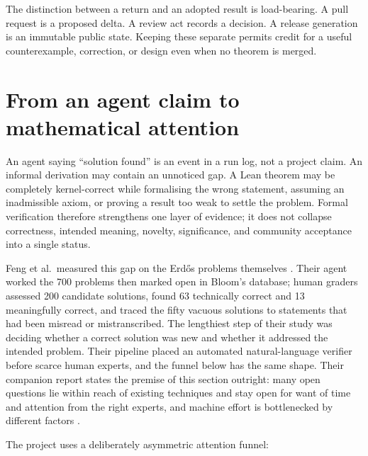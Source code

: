 \documentclass[10pt]{article}
\begin{document}
The distinction between a return and an adopted result is load-bearing.  A
pull request is a proposed delta.  A review act records a decision.  A release
generation is an immutable public state.  Keeping these separate permits
credit for a useful counterexample, correction, or design even when no theorem
is merged.

\section{From an agent claim to mathematical attention}\label{sec:attention}

An agent saying ``solution found'' is an event in a run log, not a project
claim.  An informal derivation may contain an unnoticed gap.  A Lean theorem
may be completely kernel-correct while formalising the wrong statement,
assuming an inadmissible axiom, or proving a result too weak to settle the
problem.  Formal verification therefore strengthens one layer of evidence;
it does not collapse correctness, intended meaning, novelty, significance,
and community acceptance into a single status.

Feng et al.\ measured this gap on the Erd\H{o}s problems themselves
\cite{aletheia}.  Their agent worked the 700 problems then marked open in
Bloom's database; human graders assessed 200 candidate solutions, found 63
technically correct and 13 meaningfully correct, and traced the fifty vacuous
solutions to statements that had been misread or mistranscribed.  The
lengthiest step of their study was deciding whether a correct solution was
new and whether it addressed the intended problem.  Their pipeline placed an
automated natural-language verifier before scarce human experts, and the
funnel below has the same shape.  Their companion report states the premise
of this section outright: many open questions lie within reach of existing
techniques and stay open for want of time and attention from the right
experts, and machine effort is bottlenecked by different factors
\cite{autonomousmath}.

The project uses a deliberately asymmetric attention funnel:
\end{document}
